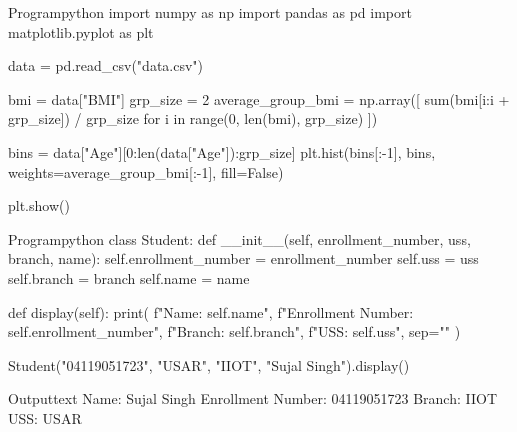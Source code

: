 \documentclass[11pt]{ipu-python}
\begin{document}
    \begin{code}
        {Program}{python}
import numpy as np
import pandas as pd
import matplotlib.pyplot as plt

data = pd.read_csv("data.csv")

bmi = data["BMI"]
grp_size = 2
average_group_bmi = np.array([
    sum(bmi[i:i + grp_size]) / grp_size
    for i in range(0, len(bmi), grp_size)
])

bins = data["Age"][0:len(data["Age"]):grp_size]
plt.hist(bins[:-1], bins, weights=average_group_bmi[:-1], fill=False)

plt.show()
    \end{code}
    \newpage

    \begin{code}
        {Program}{python}
class Student:
    def __init__(self, enrollment_number, uss, branch, name):
        self.enrollment_number = enrollment_number
        self.uss = uss
        self.branch = branch
        self.name = name

    def display(self):
        print(
            f"Name: {self.name}",
            f"Enrollment Number: {self.enrollment_number}",
            f"Branch: {self.branch}",
            f"USS: {self.uss}",
            sep="\n"
        )


Student("04119051723", "USAR", "IIOT", "Sujal Singh").display()
    \end{code}
    \begin{code}
        {Output}{text}
Name: Sujal Singh
Enrollment Number: 04119051723
Branch: IIOT
USS: USAR
    \end{code}
\end{document}

